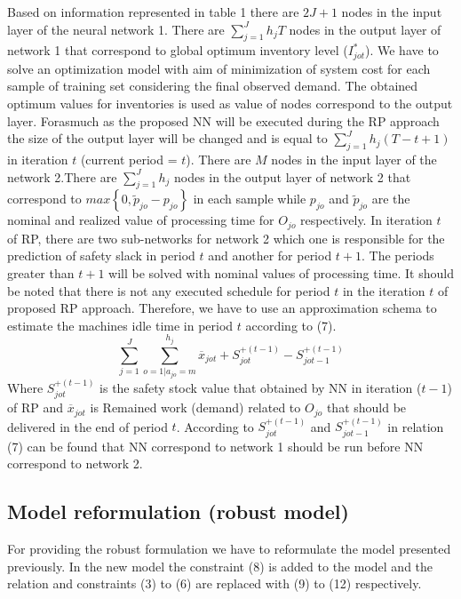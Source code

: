 \documentclass[letterpaper]{article} %
\begin{document}
Based on information represented in table 1 there are $2J+1$ nodes in the input layer of the neural network 1. There are $\sum_{j=1}^{J} h_{j}T$ nodes in the output layer of network 1 that correspond to global optimum inventory level ($I_{jot}^{*}$). We have to solve an optimization model with aim of minimization of system cost for each sample of training set considering the final observed demand. The obtained optimum values for inventories is used as value of nodes correspond to the output layer. Forasmuch as the proposed NN will be executed during the RP approach the size of the output layer will be changed and is equal to $\sum_{j=1}^{J} h_{j}(T-t+1)$ in iteration $t$ (current period = $t$). 
There are $M$ nodes in the input layer of the network 2.There are $\sum_{j=1}^{J} h_{j}$ nodes in the output layer of network 2 that correspond to $max\left\{0,\tilde{p}_{jo}-p_{jo}\right\}$ in each sample while $p_{jo}$ and $\tilde{p}_{jo}$ are the nominal and realized value of processing time for $O_{jo}$ respectively. In iteration $t$ of RP, there are two sub-networks for network 2 which one is responsible for the prediction of safety slack in period $t$ and another for period $t+1$. The periods greater than $t+1$ will be solved with nominal values of processing time. It should be noted that there is not any executed schedule for period $t$ in the iteration $t$ of proposed RP approach. Therefore, we have to use an approximation schema to estimate the machines idle time in period $t$ according to (7).
\begin{equation}
\sum_{j=1}^{J} \sum_{o=1|a_{jo}=m}^{h_{j}} \overline{x}_{jot}+S_{jot}^{+(t-1)}-S_{jot-1}^{+(t-1)}
\end{equation}
Where $S_{jot}^{+(t-1)}$ is the safety stock value that obtained by NN in iteration ($t-1$) of RP and $\overline{x}_{jot}$ is Remained work (demand) related to $O_{jo}$ that should be delivered in the end of period $t$.
According to $S_{jot}^{+(t-1)}$ and $S_{jot-1}^{+(t-1)}$ in relation (7) can be found that NN correspond to network 1 should be run before NN correspond to network 2.

\subsection{Model reformulation (robust model)}
For providing the robust formulation we have to reformulate the model presented previously. In the new model the constraint (8) is added to the model and the relation and constraints (3) to (6) are replaced with (9) to (12) respectively.
\end{document}
